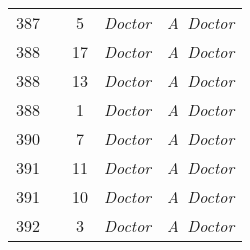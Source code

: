 \documentclass[a4paper,11pt]{article}
\begin{document}
\begin{center}
\begin{tabular}{|c|c|c|c|c|}
    387 & & \hphantom{0}5 & \textit{Doctor} & \textit{A~Doctor} \\
    388 & & 17 & \textit{Doctor} & \textit{A~Doctor} \\
    388 & & 13 & \textit{Doctor} & \textit{A~Doctor} \\
    388 & & \hphantom{0}1 & \textit{Doctor} & \textit{A~Doctor} \\
    390 & & \hphantom{0}7 & \textit{Doctor} & \textit{A~Doctor} \\
    391 & & 11 & \textit{Doctor} & \textit{A~Doctor} \\
    391 & & 10 & \textit{Doctor} & \textit{A~Doctor} \\
    392 & & \hphantom{0}3 & \textit{Doctor} & \textit{A~Doctor} \\
    \hline
  \end{tabular}





  \newpage


\end{center}
\end{document}
